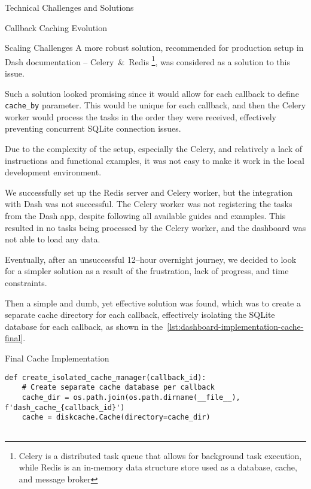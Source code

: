 \begin{section}{Technical Challenges and Solutions}
\begin{subsection}{Callback Caching Evolution}
\begin{subsubsection}{Scaling Challenges}
			A more robust solution, recommended for production setup in Dash documentation – Celery~\&~Redis
			\footnote{Celery is a distributed task queue that allows for background task execution, while Redis is an in-memory data structure store used as a database, cache, and message broker\cite{reintech_blog_combining_celery_redis_caching_task_queuing}\cite{celery_getting_started_introduction}\cite{redis_latest}},
			was considered as a solution to this issue.

			Such a solution looked promising since it would allow for each callback to define \texttt{cache\_by} parameter.
			This would be unique for each callback, and then the Celery worker would process the tasks in the order they were received, effectively preventing concurrent SQLite connection issues.

			Due to the complexity of the setup, especially the Celery, and relatively a lack of instructions and functional examples, it was not easy to make it work in the local development environment.

			We successfully set up the Redis server and Celery worker, but the integration with Dash was not successful.
			The Celery worker was not registering the tasks from the Dash app, despite following all available guides and examples.
			This resulted in no tasks being processed by the Celery worker, and the dashboard was not able to load any data.

			Eventually, after an unsuccessful 12–hour overnight journey, we decided to look for a simpler solution as a result of the frustration, lack of progress, and time constraints.

			Then a simple and dumb, yet effective solution was found, which was to create a separate cache directory for each callback,
			effectively isolating the SQLite database for each callback, as shown in the~\autoref{lst:dashboard-implementation-cache-final}.

			\vspace*{\fill}\pagebreak[4] %

			\begin{listing}[H]
				\caption{Final Cache Implementation}
				\begin{verbatim}
def create_isolated_cache_manager(callback_id):
    # Create separate cache database per callback
    cache_dir = os.path.join(os.path.dirname(__file__), f'dash_cache_{callback_id}')
    cache = diskcache.Cache(directory=cache_dir)


\end{verbatim}
\end{listing}
\end{subsubsection}
\end{subsection}
\end{section}
